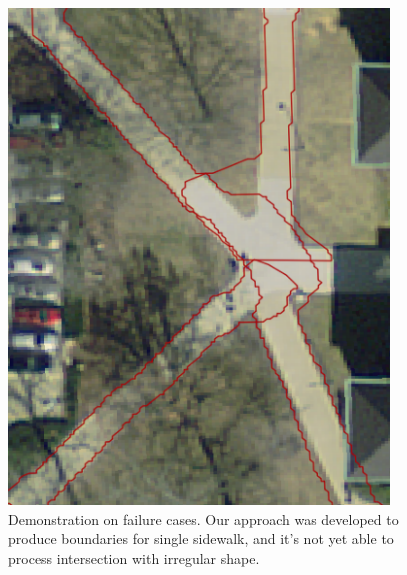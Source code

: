 \begin{figure}
    \centering
    \includegraphics[width=0.9\textwidth]{Figures/oxford_fail_2.png}
    \caption[Failure Case 2]{Demonstration on failure cases. Our approach was developed to produce boundaries for single sidewalk, and it's not yet able to process intersection with irregular shape.}
    \label{fig:oxford_fail_2}
\end{figure} 

